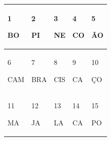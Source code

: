 \begin{longtable}[]{@{}lllll@{}}
\toprule
\begin{minipage}[b]{0.19\columnwidth}\raggedright\strut
1

BO\strut
\end{minipage} & \begin{minipage}[b]{0.19\columnwidth}\raggedright\strut
2

PI\strut
\end{minipage} & \begin{minipage}[b]{0.19\columnwidth}\raggedright\strut
3

NE\strut
\end{minipage} & \begin{minipage}[b]{0.19\columnwidth}\raggedright\strut
4

CO\strut
\end{minipage} & \begin{minipage}[b]{0.19\columnwidth}\raggedright\strut
5

ÃO\strut
\end{minipage}\tabularnewline
\midrule
\endhead
\begin{minipage}[t]{0.19\columnwidth}\raggedright\strut
6

CAM\strut
\end{minipage} & \begin{minipage}[t]{0.19\columnwidth}\raggedright\strut
7

BRA\strut
\end{minipage} & \begin{minipage}[t]{0.19\columnwidth}\raggedright\strut
8

CIS\strut
\end{minipage} & \begin{minipage}[t]{0.19\columnwidth}\raggedright\strut
9

CA\strut
\end{minipage} & \begin{minipage}[t]{0.19\columnwidth}\raggedright\strut
10

ÇO\strut
\end{minipage}\tabularnewline
\begin{minipage}[t]{0.19\columnwidth}\raggedright\strut
11

MA\strut
\end{minipage} & \begin{minipage}[t]{0.19\columnwidth}\raggedright\strut
12

JA\strut
\end{minipage} & \begin{minipage}[t]{0.19\columnwidth}\raggedright\strut
13

LA\strut
\end{minipage} & \begin{minipage}[t]{0.19\columnwidth}\raggedright\strut
14

CA\strut
\end{minipage} & \begin{minipage}[t]{0.19\columnwidth}\raggedright\strut
15

PO\strut
\end{minipage}\tabularnewline
\bottomrule
\end{longtable}


